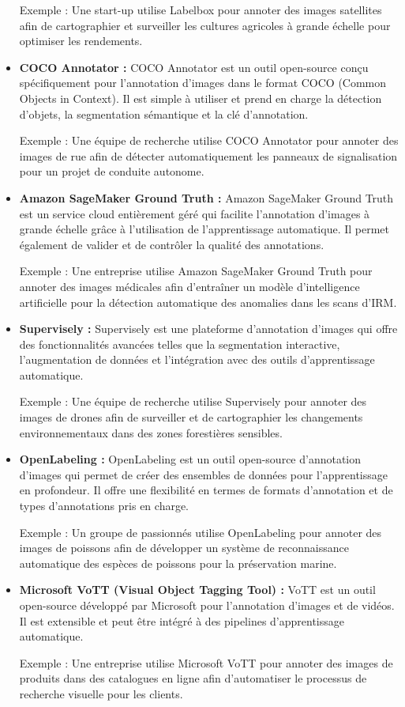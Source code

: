 \documentclass{article}
\begin{document}
\begin{itemize}
		Exemple : Une start-up utilise Labelbox pour annoter des images satellites afin de cartographier et surveiller les cultures agricoles à grande échelle pour optimiser les rendements.
		
		\item \textbf{COCO Annotator : }COCO Annotator est un outil open-source conçu spécifiquement pour l'annotation d'images dans le format COCO (Common Objects in Context). Il est simple à utiliser et prend en charge la détection d'objets, la segmentation sémantique et la clé d'annotation.
		
		Exemple : Une équipe de recherche utilise COCO Annotator pour annoter des images de rue afin de détecter automatiquement les panneaux de signalisation pour un projet de conduite autonome.
		
		\item \textbf{Amazon SageMaker Ground Truth : }Amazon SageMaker Ground Truth est un service cloud entièrement géré qui facilite l'annotation d'images à grande échelle grâce à l'utilisation de l'apprentissage automatique. Il permet également de valider et de contrôler la qualité des annotations.
		
		Exemple : Une entreprise utilise Amazon SageMaker Ground Truth pour annoter des images médicales afin d'entraîner un modèle d'intelligence artificielle pour la détection automatique des anomalies dans les scans d'IRM.
		
		\item \textbf{Supervisely : }Supervisely est une plateforme d'annotation d'images qui offre des fonctionnalités avancées telles que la segmentation interactive, l'augmentation de données et l'intégration avec des outils d'apprentissage automatique.
		
		Exemple : Une équipe de recherche utilise Supervisely pour annoter des images de drones afin de surveiller et de cartographier les changements environnementaux dans des zones forestières sensibles.
		\item \textbf{OpenLabeling  : }OpenLabeling est un outil open-source d'annotation d'images qui permet de créer des ensembles de données pour l'apprentissage en profondeur. Il offre une flexibilité en termes de formats d'annotation et de types d'annotations pris en charge.
		
		Exemple : Un groupe de passionnés utilise OpenLabeling pour annoter des images de poissons afin de développer un système de reconnaissance automatique des espèces de poissons pour la préservation marine.
	
		\item \textbf{Microsoft VoTT (Visual Object Tagging Tool) :  }    VoTT est un outil open-source développé par Microsoft pour l'annotation d'images et de vidéos. Il est extensible et peut être intégré à des pipelines d'apprentissage automatique.
		
		Exemple : Une entreprise utilise Microsoft VoTT pour annoter des images de produits dans des catalogues en ligne afin d'automatiser le processus de recherche visuelle pour les clients.
	\end{itemize}
	
\end{document}
